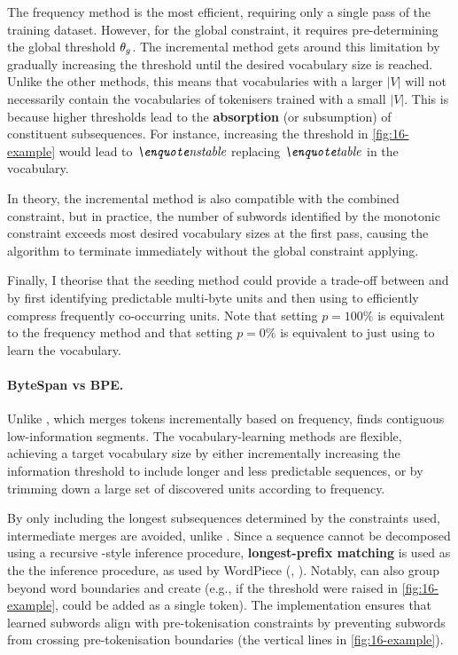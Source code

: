 The frequency method is the most efficient, requiring only a single pass of the training dataset. However, for the global constraint, it requires pre-determining the global threshold $\theta_g$. The incremental method gets around this limitation by gradually increasing the threshold until the desired vocabulary size is reached. Unlike the other methods, this means that vocabularies with a larger \(|V|\) will not necessarily contain the vocabularies of tokenisers trained with a small \(|V|\). This is because higher thresholds lead to the \textbf{absorption} (or subsumption) of constituent subsequences. For instance, increasing the threshold in \cref{fig:16-example} would lead to $\ex{nstable}$ replacing $\ex{table}$ in the vocabulary.

In theory, the incremental method is also compatible with the combined constraint, but in practice, the number of subwords identified by the monotonic constraint exceeds most desired vocabulary sizes at the first pass, causing the algorithm to terminate immediately without the global constraint applying.

Finally, I theorise that the seeding method could provide a trade-off between \tokname and \bpe by first identifying predictable multi-byte units and then using \bpe to efficiently compress frequently co-occurring units. Note that setting $p=100\%$ is equivalent to the frequency method and that setting  $p=0\%$ is equivalent to just using \bpe to learn the vocabulary.

\paragraph{ByteSpan vs BPE.}

Unlike \bpe, which merges tokens incrementally based on frequency, \tokname finds contiguous low-information segments. The vocabulary-learning methods are flexible, achieving a target vocabulary size by either incrementally increasing the information threshold to include longer and less predictable sequences, or by trimming down a large set of discovered units according to frequency.

By only including the longest subsequences determined by the constraints used, intermediate merges are avoided, unlike \bpe. Since a sequence cannot be decomposed using a recursive \bpe-style inference procedure, \textbf{longest-prefix matching} is used as the the inference procedure, as used by WordPiece (\wordpiece, \citealp{schuster-nakajima-2012-voice}). Notably, \tokname can also group beyond word boundaries and create  (e.g., if the threshold were raised in \cref{fig:16-example},  could be added as a single token). The implementation ensures that learned subwords align with \bpe pre-tokenisation constraints by preventing subwords from crossing pre-tokenisation boundaries (the vertical lines in \cref{fig:16-example}).

